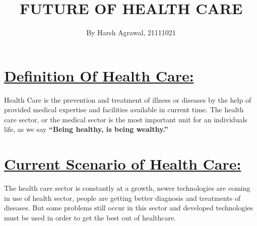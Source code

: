 \documentclass[18pt]{article}
\title{\textbf{FUTURE OF HEALTH CARE}}
\author{By Harsh Agrawal, 21111021}
\date{}
\begin{document}
\maketitle
\section{\underline{Definition Of Health Care:}}
Health Care is the prevention and treatment of illness or diseases by the help of provided medical expertise and facilities available in current time.
\newline The health care sector, or the medical sector is the most important unit for an individuals life, as we say \textbf{“Being healthy, is being wealthy.”}
\section{\underline{Current Scenario of Health Care:}}
The health care sector is constantly at a growth, newer technologies are coming in use of health sector, people are getting better diagnosis and treatments of diseases. \newline But some problems still occur in this sector and developed technologies must be used in order to get the best out of healthcare.
\end{document}
